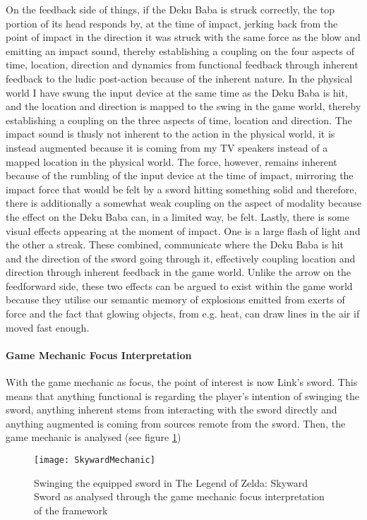 On the feedback side of things, if the Deku Baba is struck correctly, the top portion of its head responds by, at the time of impact, jerking back from the point of impact in the direction it was struck with the same force as the blow and emitting an impact sound, thereby establishing a coupling on the four aspects of time, location, direction and dynamics from functional feedback through inherent feedback to the ludic post-action because of the inherent nature. In the physical world I have swung the input device at the same time as the Deku Baba is hit, and the location and direction is mapped to the swing in the game world, thereby establishing a coupling on the three aspects of time, location and direction. The impact sound is thusly not inherent to the action in the physical world, it is instead augmented because it is coming from my TV speakers instead of a mapped location in the physical world. The force, however, remains inherent because of the rumbling of the input device at the time of impact, mirroring the impact force that would be felt by a sword hitting something solid and therefore, there is additionally a somewhat weak coupling on the aspect of modality because the effect on the Deku Baba can, in a limited way, be felt. Lastly, there is some visual effects appearing at the moment of impact. One is a large flash of light and the other a streak. These combined, communicate where the Deku Baba is hit and the direction of the sword going through it, effectively coupling location and direction through inherent feedback in the game world. Unlike the arrow on the feedforward side, these two effects can be argued to exist within the game world because they utilise our semantic memory of explosions emitted from exerts of force and the fact that glowing objects, from e.g. heat, can draw lines in the air if moved fast enough.

\paragraph{Game Mechanic Focus Interpretation}
With the game mechanic as focus, the point of interest is now Link's sword. This means that anything functional is regarding the player's intention of swinging the sword, anything inherent stems from interacting with the sword directly and anything augmented is coming from sources remote from the sword. Then, the game mechanic is analysed (see figure \ref{SkywardMechanic})

\begin{figure}[hb]
  \texttt{[image: SkywardMechanic]}
  \caption{Swinging the equipped sword in The Legend of Zelda: Skyward Sword as analysed through the game mechanic focus interpretation of the framework}
  \label{SkywardMechanic}
\end{figure}

